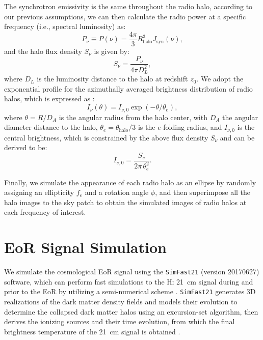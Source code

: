 \documentclass[modern]{aastex61}
\newcommand{\R}[1]{\mathrm{#1}}
\newcommand{\Hi}{H\textsc{i}}
\begin{document}
The synchrotron emissivity is the same throughout the radio halo,
according to our previous assumptions, we can then calculate the radio
power at a specific frequency (i.e., spectral luminosity) as:
\begin{equation}
  \label{eq:halo-power}
  P_{\nu} \equiv P(\nu) = \frac{4\pi}{3} R_{\R{halo}}^3 J_{\R{syn}}(\nu),
\end{equation}
and the halo flux density $S_{\nu}$ is given by:
\begin{equation}
  \label{eq:halo-flux-density}
  S_{\nu} = \frac{P_{\nu}}{4\pi D_L^2},
\end{equation}
where $D_L$ is the luminosity distance to the halo at redshift $z_0$.
We adopt the exponential profile for the azimuthally averaged brightness
distribution of radio halos, which is expressed as \citep{murgia2009}:
\begin{equation}
  \label{eq:halo-exprofile}
  I_{\nu}(\theta) = I_{\nu,0} \exp(-\theta/\theta_e),
\end{equation}
where $\theta = R / D_A$ is the angular radius from the halo center,
with $D_A$ the angular diameter distance to the halo,
$\theta_e = \theta_{\R{halo}}/3$ is the $e$-folding radius,
and $I_{\nu,0}$ is the central brightness, which is constrained by the
above flux density $S_{\nu}$ and can be derived to be:
\begin{equation}
  \label{eq:central-brightness}
  I_{\nu,0} = \frac{S_{\nu}}{2\pi \,\theta_e^2}.
\end{equation}

Finally, we simulate the appearance of each radio halo as an ellipse by
randomly assigning an ellipticity $f_e$ and a rotation angle $\phi$,
and then superimpose all the halo images to the sky patch to obtain the
simulated images of radio halos at each frequency of interest.


\section{EoR Signal Simulation}
\label{sec:eor-simulation}

We simulate the cosmological EoR signal using the \texttt{SimFast21}
(version 20170627) software, which can perform fast simulations to the
\Hi{} \SI{21}{\cm} signal during and prior to the EoR by utilizing a
semi-numerical scheme \citep{santos2010,hassan2016}.
\texttt{SimFast21} generates 3D realizations of the dark matter density
fields and models their evolution to determine the collapsed dark matter
halos using an excursion-set algorithm, then derives the ionizing sources
and their time evolution, from which the final brightness temperature of
the \SI{21}{\cm} signal is obtained \citep{santos2010}.
\end{document}
